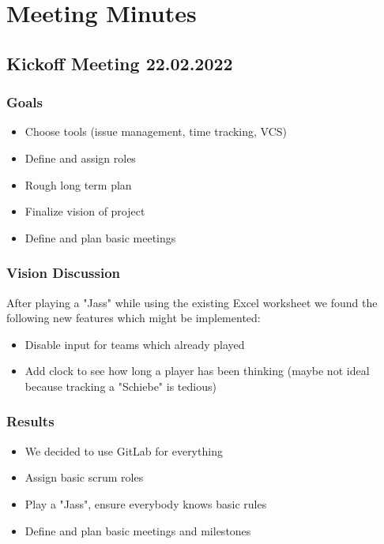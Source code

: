 \chapter{Meeting Minutes}

\section{Kickoff Meeting 22.02.2022}

\subsection{Goals}
\begin{itemize}
    \item Choose tools (issue management, time tracking, VCS)
    \item Define and assign roles
    \item Rough long term plan
    \item Finalize vision of project
    \item Define and plan basic meetings
\end{itemize}

\subsection{Vision Discussion}

After playing a "Jass" while using the existing Excel worksheet we found the following new features which might be implemented:

\begin{itemize}
    \item Disable input for teams which already played
    \item Add clock to see how long a player has been thinking (maybe not ideal because tracking a "Schiebe" is tedious)
\end{itemize}

\subsection{Results}
\begin{itemize}
    \item We decided to use GitLab for everything
    \item Assign basic scrum roles
    \item Play a "Jass", ensure everybody knows basic rules
    \item Define and plan basic meetings and milestones
\end{itemize}

